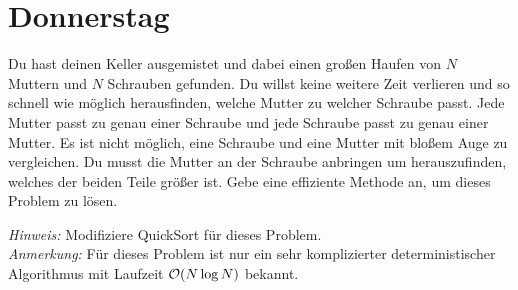 \documentclass{uebung_cs}
\begin{document}
\section*{Donnerstag}

\begin{aufgabe}
	Du hast deinen Keller ausgemistet und dabei einen großen Haufen von $N$ Muttern und $N$ Schrauben gefunden. Du willst keine weitere Zeit verlieren und so schnell wie möglich herausfinden, welche Mutter zu welcher Schraube passt. Jede Mutter passt zu genau einer Schraube und jede Schraube passt zu genau einer Mutter. Es ist nicht möglich, eine Schraube und eine Mutter mit bloßem Auge zu vergleichen. Du musst die Mutter an der Schraube anbringen um herauszufinden, welches der beiden Teile größer ist. Gebe eine effiziente Methode an, um dieses Problem zu lösen.
	
	\textit{Hinweis:} Modifiziere QuickSort für dieses Problem.\\
	\textit{Anmerkung:} Für dieses Problem ist nur ein sehr komplizierter deterministischer Algorithmus mit Laufzeit $\mathcal{O}(N \log N)$ bekannt. 
\end{aufgabe}
\end{document}
